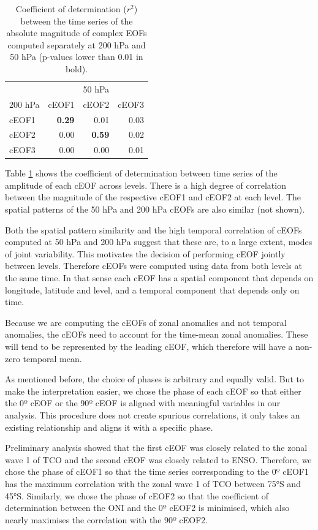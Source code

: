 \documentclass[pdflatex,lineno,sn-basic]{sn-jnl}
\theoremstyle{thmstyleone}%
\theoremstyle{thmstyletwo}%
\theoremstyle{thmstylethree}%
\begin{document}
\begin{table}

\caption{\label{tab:corr-ceof-splitted}Coefficient of determination (\(r^2\)) between the time series of the absolute magnitude of complex EOFs computed separately at 200 hPa and 50 hPa (p-values lower than 0.01 in bold).}
\centering
\begin{tabular}[t]{l>{}r>{}r>{}r}
\toprule
\multicolumn{1}{c}{} & \multicolumn{3}{c}{50 hPa} \\
\cmidrule(l{3pt}r{3pt}){2-4}
200 hPa & cEOF1 & cEOF2 & cEOF3\\
\midrule
cEOF1 & \textbf{0.29} & 0.01 & 0.03\\
cEOF2 & 0.00 & \textbf{0.59} & 0.02\\
cEOF3 & 0.00 & 0.00 & 0.01\\
\bottomrule
\end{tabular}
\end{table}

Table \ref{tab:corr-ceof-splitted} shows the coefficient of determination between time series of the amplitude of each cEOF across levels.
There is a high degree of correlation between the magnitude of the respective cEOF1 and cEOF2 at each level.
The spatial patterns of the 50 hPa and 200 hPa cEOFs are also similar (not shown).

Both the spatial pattern similarity and the high temporal correlation of cEOFs computed at 50 hPa and 200 hPa suggest that these are, to a large extent, modes of joint variability.
This motivates the decision of performing cEOF jointly between levels.
Therefore cEOFs were computed using data from both levels at the same time.
In that sense each cEOF has a spatial component that depends on longitude, latitude and level, and a temporal component that depends only on time.

Because we are computing the cEOFs of zonal anomalies and not temporal anomalies, the cEOFs need to account for the time-mean zonal anomalies.
These will tend to be represented by the leading cEOF, which therefore will have a non-zero temporal mean.

As mentioned before, the choice of phases is arbitrary and equally valid.
But to make the interpretation easier, we chose the phase of each cEOF so that either the 0º cEOF or the 90º cEOF is aligned with meaningful variables in our analysis.
This procedure does not create spurious correlations, it only takes an existing relationship and aligns it with a specific phase.

Preliminary analysis showed that the first cEOF was closely related to the zonal wave 1 of TCO and the second cEOF was closely related to ENSO.
Therefore, we chose the phase of cEOF1 so that the time series corresponding to the 0º cEOF1 has the maximum correlation with the zonal wave 1 of TCO between 75°S and 45°S.
Similarly, we chose the phase of cEOF2 so that the coefficient of determination between the ONI and the 0º cEOF2 is minimised, which also nearly maximises the correlation with the 90º cEOF2.
\end{document}

